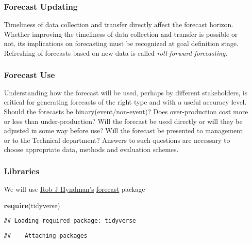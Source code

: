 \documentclass[]{article}
\newenvironment{Shaded}{\begin{snugshade}}{\end{snugshade}}
\newcommand{\KeywordTok}[1]{\textcolor[rgb]{0.13,0.29,0.53}{\textbf{#1}}}
\newcommand{\NormalTok}[1]{#1}
\begin{document}
\subsubsection{Forecast Updating}\label{forecast-updating}

Timeliness of data collection and transfer directly affect the forecast
horizon. Whether improving the timeliness of data collection and
transfer is possible or not, its implications on forecasting must be
recognized at goal definition stage. Refreshing of forecasts based on
new data is called \emph{roll-forward forecasting}.

\subsubsection{Forecast Use}\label{forecast-use}

Understanding how the forecast will be used, perhaps by different
stakeholders, is critical for generating forecasts of the right type and
with a useful accuracy level. Should the forecasts be
binary(event/non-event)? Does over-production cost more or less than
under-production? Will the forecast be used directly or will they be
adjusted in some way before use? Will the forecast be presented to
management or to the Technical department? Answers to such questions are
necessary to choose appropriate data, methods and evaluation schemes.

\subsubsection{Libraries}\label{libraries}

We will use \href{https://robjhyndman.com/about/}{Rob J Hyndman's}
\href{https://www.rdocumentation.org/packages/forecast/versions/8.3}{forecast}
package

\begin{Shaded}
\begin{Highlighting}[]
\KeywordTok{require}\NormalTok{(tidyverse) }
\end{Highlighting}
\end{Shaded}

\begin{verbatim}
## Loading required package: tidyverse
\end{verbatim}

\begin{verbatim}
## -- Attaching packages --------------
\end{verbatim}
\end{document}
